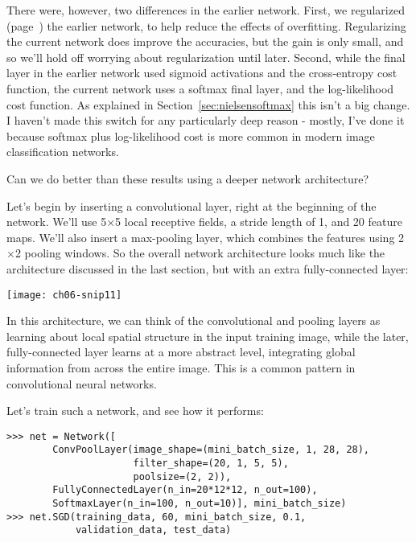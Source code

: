 There were, however, two differences in the earlier network. First, we regularized (page~\pageref{sec:Overfittingandregularization}) the earlier network, to help reduce the effects of overfitting. Regularizing the current network does improve the accuracies, but the gain is only small, and so we'll hold off worrying about regularization until later. Second, while the final layer in the earlier network used sigmoid activations and the cross-entropy cost function, the current network uses a softmax final layer, and the log-likelihood cost function. As explained in Section~\ref{sec:nielsensoftmax} this isn't a big change. I haven't made this switch for any particularly deep reason - mostly, I've done it because softmax plus log-likelihood cost is more common in modern image classification networks.

Can we do better than these results using a deeper network architecture?

Let's begin by inserting a convolutional layer, right at the beginning of the network. We'll use 5$\times$5 local receptive fields, a stride length of 1, and 20 feature maps. We'll also insert a max-pooling layer, which combines the features using 2$\times$2 pooling windows. So the overall network architecture looks much like the architecture discussed in the last section, but with an extra fully-connected layer:
\begin{figure*}[tph]
    \texttt{[image: ch06-snip11]}
    \end{figure*}

In this architecture, we can think of the convolutional and pooling layers as learning about local spatial structure in the input training image, while the later, fully-connected layer learns at a more abstract level, integrating global information from across the entire image. This is a common pattern in convolutional neural networks.

Let's train such a network, and see how it performs:

\begin{lstlisting}
>>> net = Network([
        ConvPoolLayer(image_shape=(mini_batch_size, 1, 28, 28), 
                      filter_shape=(20, 1, 5, 5), 
                      poolsize=(2, 2)),
        FullyConnectedLayer(n_in=20*12*12, n_out=100),
        SoftmaxLayer(n_in=100, n_out=10)], mini_batch_size)
>>> net.SGD(training_data, 60, mini_batch_size, 0.1, 
            validation_data, test_data)
\end{lstlisting}

